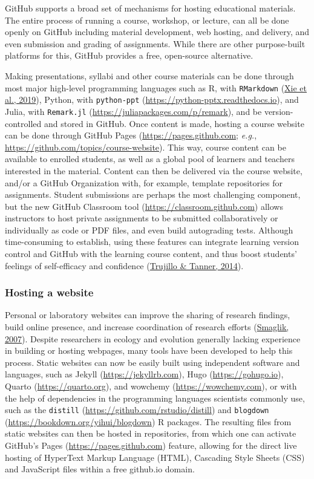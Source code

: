 GitHub supports a broad set of mechanisms for hosting educational materials.
The entire process of running a course, workshop, or lecture, can all be done openly on GitHub including material development, web hosting, and delivery, and even submission and grading of assignments.
While there are other purpose-built platforms for this, GitHub provides a free, open-source alternative.

Making presentations, syllabi and other course materials can be done through most major high-level programming languages such as R, with \texttt{RMarkdown} (\protect\hyperlink{ref-QqMezOMg}{Xie et al., 2019}), Python, with \texttt{python-ppt} (\url{https://python-pptx.readthedocs.io}), and Julia, with \texttt{Remark.jl} (\url{https://juliapackages.com/p/remark}), and be version-controlled and stored in GitHub.
Once content is made, hosting a course website can be done through GitHub Pages (\url{https://pages.github.com}; \emph{e.g.}, \url{https://github.com/topics/course-website}).
This way, course content can be available to enrolled students, as well as a global pool of learners and teachers interested in the material.
Content can then be delivered via the course website, and/or a GitHub Organization with, for example, template repositories for assignments.
Student submissions are perhaps the most challenging component, but the new GitHub Classroom tool (\url{https://classroom.github.com}) allows instructors to host private assignments to be submitted collaboratively or individually as code or PDF files, and even build autograding tests.
Although time-consuming to establish, using these features can integrate learning version control and GitHub with the learning course content, and thus boost students' feelings of self-efficacy and confidence (\protect\hyperlink{ref-dqrFjoSb}{Trujillo \& Tanner, 2014}).

\hypertarget{hosting-a-website}{%
\subsubsection{Hosting a website}\label{hosting-a-website}}

Personal or laboratory websites can improve the sharing of research findings, build online presence, and increase coordination of research efforts (\protect\hyperlink{ref-HiIPSSHV}{Smaglik, 2007}).
Despite researchers in ecology and evolution generally lacking experience in building or hosting webpages, many tools have been developed to help this process.
Static websites can now be easily built using independent software and languages, such as Jekyll (\url{https://jekyllrb.com}), Hugo (\url{https://gohugo.io}), Quarto (\url{https://quarto.org}), and wowchemy (\url{https://wowchemy.com}), or with the help of dependencies in the programming languages scientists commonly use, such as the \texttt{distill} (\url{https://github.com/rstudio/distill}) and \texttt{blogdown} (\url{https://bookdown.org/yihui/blogdown}) R packages.
The resulting files from static websites can then be hosted in repositories, from which one can activate GitHub's Pages (\url{https://pages.github.com}) feature, allowing for the direct live hosting of HyperText Markup Language (HTML), Cascading Style Sheets (CSS) and JavaScript files within a free github.io domain.

